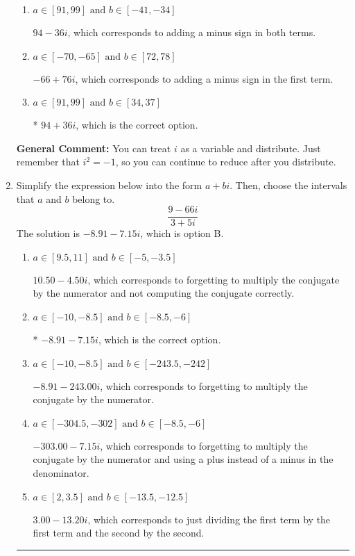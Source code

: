 \documentclass{extbook}[14pt]
\newcommand{\litem}[1]{\item #1

\rule{\textwidth}{0.4pt}}
\begin{document}
\begin{enumerate}
{\begin{enumerate}[label=\Alph*.]
 $14 - 80 i$, which corresponds to just multiplying the real terms to get the real part of the solution and the coefficients in the complex terms to get the complex part.
\item \( a \in [91, 99] \text{ and } b \in [-41, -34] \)

 $94 - 36 i$, which corresponds to adding a minus sign in both terms.
\item \( a \in [-70, -65] \text{ and } b \in [72, 78] \)

 $-66 + 76 i$, which corresponds to adding a minus sign in the first term.
\item \( a \in [91, 99] \text{ and } b \in [34, 37] \)

* $94 + 36 i$, which is the correct option.
\end{enumerate}

\textbf{General Comment:} You can treat $i$ as a variable and distribute. Just remember that $i^2=-1$, so you can continue to reduce after you distribute.
}
\litem{
Simplify the expression below into the form $a+bi$. Then, choose the intervals that $a$ and $b$ belong to.
\[ \frac{9 - 66 i}{3 + 5 i} \]
The solution is \( -8.91  - 7.15 i \), which is option B.\begin{enumerate}[label=\Alph*.]
\item \( a \in [9.5, 11] \text{ and } b \in [-5, -3.5] \)

 $10.50  - 4.50 i$, which corresponds to forgetting to multiply the conjugate by the numerator and not computing the conjugate correctly.
\item \( a \in [-10, -8.5] \text{ and } b \in [-8.5, -6] \)

* $-8.91  - 7.15 i$, which is the correct option.
\item \( a \in [-10, -8.5] \text{ and } b \in [-243.5, -242] \)

 $-8.91  - 243.00 i$, which corresponds to forgetting to multiply the conjugate by the numerator.
\item \( a \in [-304.5, -302] \text{ and } b \in [-8.5, -6] \)

 $-303.00  - 7.15 i$, which corresponds to forgetting to multiply the conjugate by the numerator and using a plus instead of a minus in the denominator.
\item \( a \in [2, 3.5] \text{ and } b \in [-13.5, -12.5] \)

 $3.00  - 13.20 i$, which corresponds to just dividing the first term by the first term and the second by the second.
\end{enumerate}

}
\end{enumerate}
\end{document}
